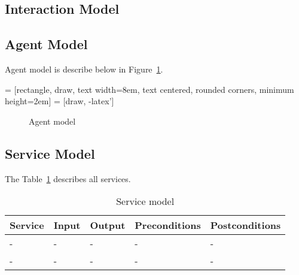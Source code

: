 \documentclass[a4paper,11pt]{report}
\begin{document}
  \subsection{Interaction Model}
  
  \subsection{Agent Model}
  
  
  Agent model is describe below in Figure~\ref{figure:agent_model}.
  
 = [rectangle, draw, %
    text width=8em, text centered, rounded corners, minimum height=2em]
 = [draw, -latex']
    
\begin{figure}[ht!]
\caption{Agent model}
\label{figure:agent_model}
\end{figure}

  
  \subsection{Service Model}
  
  The Table~\ref{table:service_model} describes all services.
  
  \newcommand*{\thead}[1]{\multicolumn{1}{c}{\bfseries #1}}
  \begin{table}[ht!]
  \begin{tabular}{|l|l|l|l|l|}
  \thead{Service} & \thead{Input} & \thead{Output} & \thead{Preconditions} & \thead{Postconditions} \\\hline
  - & - & - & - & - \\ \hline
  - & - & - & - & - \\ \hline
  \end{tabular}
  
  \caption{Service model}
  \label{table:service_model}
  \end{table}
\end{document}
